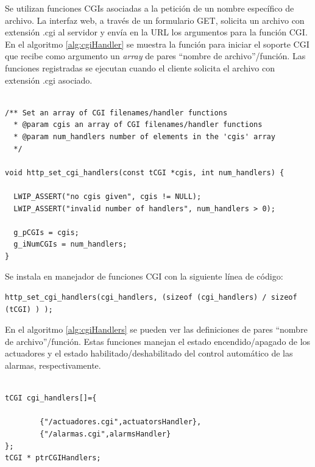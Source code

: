 Se utilizan funciones CGIs asociadas a la petición de un nombre específico de archivo.  La interfaz web, a través de un formulario GET, solicita un archivo con extensión .cgi al servidor y envía en la URL los argumentos para la función CGI. En el algoritmo \ref{alg:cgiHandler} se muestra la función para iniciar el soporte CGI que recibe como argumento un \textit{array} de pares ``nombre de archivo''/función.  Las funciones registradas se ejecutan cuando el cliente solicita el archivo con extensión .cgi asociado.  

\begin{lstlisting}[caption={Handler de funciones CGI},label={alg:cgiHandler}]  % Start your code-block

/** Set an array of CGI filenames/handler functions
  * @param cgis an array of CGI filenames/handler functions
  * @param num_handlers number of elements in the 'cgis' array
  */

void http_set_cgi_handlers(const tCGI *cgis, int num_handlers) {

  LWIP_ASSERT("no cgis given", cgis != NULL);
  LWIP_ASSERT("invalid number of handlers", num_handlers > 0);
  
  g_pCGIs = cgis;
  g_iNumCGIs = num_handlers;
}
\end{lstlisting}

Se instala en manejador de funciones CGI con la siguiente línea de código:

\begin{lstlisting}
http_set_cgi_handlers(cgi_handlers, (sizeof (cgi_handlers) / sizeof (tCGI) ) );
\end{lstlisting}

\vspace{-15px}
En el algoritmo \ref{alg:cgiHandlers} se pueden ver las definiciones de pares ``nombre de archivo''/función. Estas funciones manejan el estado encendido/apagado de los actuadores y el estado habilitado/deshabilitado del control automático de las alarmas, respectivamente.

\begin{lstlisting}[caption={Registro de nombres y funciones CGI},label={alg:cgiHandlers}]  % Start your code-block

tCGI cgi_handlers[]={

		{"/actuadores.cgi",actuatorsHandler},
		{"/alarmas.cgi",alarmsHandler}
};
tCGI * ptrCGIHandlers;
\end{lstlisting}

\clearpage
